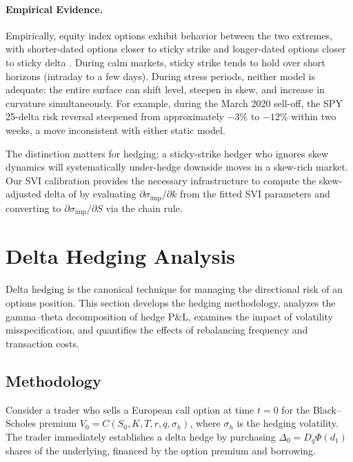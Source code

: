\documentclass[11pt,a4paper]{article}
\begin{document}
\paragraph{Empirical Evidence.}
Empirically, equity index options exhibit behavior between the two extremes, with shorter-dated options closer to sticky strike and longer-dated options closer to sticky delta \citep{gatheral2006volatility}. During calm markets, sticky strike tends to hold over short horizons (intraday to a few days). During stress periods, neither model is adequate: the entire surface can shift level, steepen in skew, and increase in curvature simultaneously. For example, during the March 2020 sell-off, the SPY 25-delta risk reversal steepened from approximately $-3\%$ to $-12\%$ within two weeks, a move inconsistent with either static model.

The distinction matters for hedging: a sticky-strike hedger who ignores skew dynamics will systematically under-hedge downside moves in a skew-rich market. Our SVI calibration provides the necessary infrastructure to compute the skew-adjusted delta of  by evaluating $\partial \sigma_{\text{imp}} / \partial k$ from the fitted SVI parameters and converting to $\partial \sigma_{\text{imp}} / \partial S$ via the chain rule.



\section{Delta Hedging Analysis}\label{sec:delta_hedging}

Delta hedging is the canonical technique for managing the directional risk of an options position. This section develops the hedging methodology, analyzes the gamma--theta decomposition of hedge P\&L, examines the impact of volatility misspecification, and quantifies the effects of rebalancing frequency and transaction costs.

\subsection{Methodology}\label{subsec:hedge_methodology}

Consider a trader who sells a European call option at time $t = 0$ for the Black--Scholes premium $V_0 = C(S_0, K, T, r, q, \sigma_h)$, where $\sigma_h$ is the hedging volatility. The trader immediately establishes a delta hedge by purchasing $\Delta_0 = D_q \Phi(d_1)$ shares of the underlying, financed by the option premium and borrowing.
\end{document}
